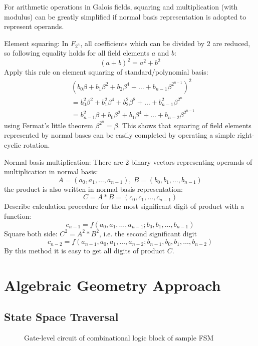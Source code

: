 \documentclass{acm_proc_article-sp}
\begin{document}
For arithmetic operations in Galois fields, squaring and multiplication (with modulus) can be greatly simplified if 
normal basis representation is adopted to represent operands.
\begin{Example}
\label{ex:nb_sq}
Element squaring: In $F_{2^n}$, all coefficients which can be divided by 2 are reduced, so 
following equality holds for all field elements $a$ and $b$:
$$(a+b)^2 = a^2 + b^2$$ 
Apply this rule on element squaring of standard/polynomial basis:
\begin{align}
& (b_0\beta + b_1\beta^2 + b_2\beta^4 + \dots + b_{n-1}\beta^{2^{n-1}})^2 \nonumber\\
&= b_0^2\beta^2 + b_1^2\beta^4 + b_2^2\beta^8 + \dots + b_{n-1}^2\beta^{2^n} \nonumber\\
&= b_{n-1}^2\beta + b_0\beta^2 + b_1\beta^4 + \dots + b_{n-2}\beta^{2^{n-1}} \nonumber
\end{align}
using Fermat's little theorem $\beta^{2^n} = \beta$. This shows that squaring of field elements
represented by normal bases can be easily completed by operating a simple right-cyclic rotation.
\end{Example}

\begin{Example}
\label{ex:nb_multi}
Normal basis multiplication: There are 2 binary vectors representing operands of multiplication in normal
basis: $$A = (a_0, a_1, \dots, a_{n-1}),\ B = (b_0, b_1, \dots, b_{n-1})$$ 
the product is also written in normal basis representation: $$C = A*B = (c_0, c_1, \dots, c_{n-1})$$
Describe calculation procedure for the most significant digit of product with a function: 
$$c_{n-1} = f(a_0, a_1, \dots, a_{n-1}; b_0, b_1, \dots, b_{n-1})$$
Square both side: $C^2 = A^2*B^2$, i.e. the second significant digit 
$$c_{n-2} = f(a_{n-1}, a_0, a_1, \dots, a_{n-2}; b_{n-1}, b_0, b_1, \dots, b_{n-2})$$ 
By this method it is easy to get all digits of product $C$.
\end{Example}
  
\section{Algebraic Geometry Approach}
\subsection{State Space Traversal}

\begin{figure}
\centering
{}
\caption{Gate-level circuit of combinational logic block of sample FSM}
\label{fig:fsm}
\end{figure}
\end{document}
